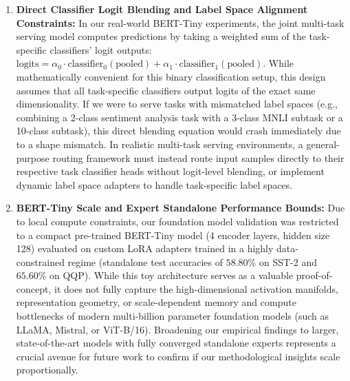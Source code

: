 \begin{enumerate}
    Furthermore, while we validated generalizability on a pre-trained \textbf{BERT-Tiny} model with custom LoRA adapters on actual GLUE datasets (SST-2 vs. QQP) and confirmed that classical parametric routers are highly effective ($62.50\%$ serving accuracy compared to SABLE's $60.00\%$) under a calibration budget of 500 samples, these classification tasks map to highly separated subspaces. For generative tasks (e.g., text summarization vs. code generation on large LLaMA or Mistral-based adapters), task embeddings exhibit much larger geometric overlap due to shared syntactic structures. In such generative environments, the routing boundary is non-trivial, meaning the small-sample overfitting bottleneck could re-emerge as a critical hazard. Under such dense overlaps, we hypothesize that the inductive geometric priors of SABLE and ChemMerge will maintain a high accuracy premium, whereas classical parametric routers will require stronger regularization or a hybrid hard-soft gating strategy. Evaluating these dynamics under generative, instruction-tuned workloads represents an exciting and essential direction for future deployment research.

    \item \textbf{Direct Classifier Logit Blending and Label Space Alignment Constraints:} In our real-world BERT-Tiny experiments, the joint multi-task serving model computes predictions by taking a weighted sum of the task-specific classifiers' logit outputs: $\text{logits} = \alpha_0 \cdot \text{classifier}_0(\text{pooled}) + \alpha_1 \cdot \text{classifier}_1(\text{pooled})$. While mathematically convenient for this binary classification setup, this design assumes that all task-specific classifiers output logits of the exact same dimensionality. If we were to serve tasks with mismatched label spaces (e.g., combining a 2-class sentiment analysis task with a 3-class MNLI subtask or a 10-class subtask), this direct blending equation would crash immediately due to a shape mismatch. In realistic multi-task serving environments, a general-purpose routing framework must instead route input samples directly to their respective task classifier heads without logit-level blending, or implement dynamic label space adapters to handle task-specific label spaces.
    
    \item \textbf{BERT-Tiny Scale and Expert Standalone Performance Bounds:} Due to local compute constraints, our foundation model validation was restricted to a compact pre-trained BERT-Tiny model (4 encoder layers, hidden size 128) evaluated on custom LoRA adapters trained in a highly data-constrained regime (standalone test accuracies of $58.80\%$ on SST-2 and $65.60\%$ on QQP). While this toy architecture serves as a valuable proof-of-concept, it does not fully capture the high-dimensional activation manifolds, representation geometry, or scale-dependent memory and compute bottlenecks of modern multi-billion parameter foundation models (such as LLaMA, Mistral, or ViT-B/16). Broadening our empirical findings to larger, state-of-the-art models with fully converged standalone experts represents a crucial avenue for future work to confirm if our methodological insights scale proportionally.


\end{enumerate}
